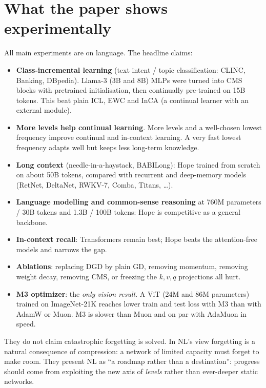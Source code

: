 \documentclass[11pt,a4paper]{article}
\begin{document}
\section{What the paper shows experimentally}

All main experiments are on language. The headline claims:
\begin{itemize}
  \item \textbf{Class-incremental learning} (text intent / topic classification: CLINC, Banking, DBpedia). Llama-3 (3B and 8B) MLPs were turned into CMS blocks with pretrained initialisation, then continually pre-trained on 15B tokens. This beat plain ICL, EWC and InCA (a continual learner with an external module).
  \item \textbf{More levels help continual learning}. More levels and a well-chosen lowest frequency improve continual and in-context learning. A very fast lowest frequency adapts well but keeps less long-term knowledge.
  \item \textbf{Long context} (needle-in-a-haystack, BABILong): Hope trained from scratch on about 50B tokens, compared with recurrent and deep-memory models (RetNet, DeltaNet, RWKV-7, Comba, Titans, \dots).
  \item \textbf{Language modelling and common-sense reasoning} at 760M parameters / 30B tokens and 1.3B / 100B tokens: Hope is competitive as a general backbone.
  \item \textbf{In-context recall}: Transformers remain best; Hope beats the attention-free models and narrows the gap.
  \item \textbf{Ablations}: replacing DGD by plain GD, removing momentum, removing weight decay, removing CMS, or freezing the $k,v,q$ projections all hurt.
  \item \textbf{M3 optimizer}: the \emph{only vision result}. A ViT (24M and 86M parameters) trained on ImageNet-21K reaches lower train and test loss with M3 than with AdamW or Muon. M3 is slower than Muon and on par with AdaMuon in speed.
\end{itemize}

\begin{careful}
They do not claim catastrophic forgetting is solved. In NL's view forgetting is a natural consequence of compression: a network of limited capacity must forget to make room. They present NL as ``a roadmap rather than a destination'': progress should come from exploiting the new axis of \emph{levels} rather than ever-deeper static networks.
\end{careful}
\end{document}
